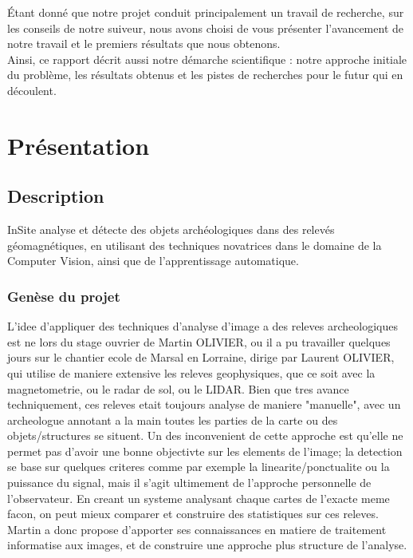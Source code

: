 \documentclass[a4paper, 12pt, titlepage, oneside, french]{article}
\begin{document}
	Étant donné que notre projet conduit principalement un travail de recherche, sur les conseils de notre suiveur, nous avons choisi de vous présenter l'avancement de notre travail et le premiers résultats que nous obtenons. \\
	Ainsi, ce rapport décrit aussi notre démarche scientifique : notre approche initiale du problème, les résultats obtenus et les pistes de recherches pour le futur qui en découlent.
	
	\newpage
\section{Présentation}
	\subsection{Description}%
		InSite analyse et détecte des objets archéologiques dans des relevés géomagnétiques, en utilisant des techniques novatrices dans le domaine de
		la Computer Vision, ainsi que de l'apprentissage automatique.

		\subsubsection{Genèse du projet}
		L'idee d'appliquer des techniques d'analyse d'image a des releves archeologiques est ne lors du stage ouvrier de Martin OLIVIER, ou il a pu travailler quelques jours sur le chantier ecole de Marsal en Lorraine, dirige par Laurent OLIVIER, qui utilise de maniere extensive les releves geophysiques, que ce soit avec la magnetometrie, ou le radar de sol, ou le LIDAR. Bien que tres avance techniquement, ces releves etait toujours analyse de maniere "manuelle", avec un archeologue annotant a la main toutes les parties de la carte ou des objets/structures se situent. Un des inconvenient de cette approche est qu'elle ne permet pas d'avoir une bonne objectivte sur les elements de l'image; la detection se base sur quelques criteres comme par exemple la linearite/ponctualite ou la puissance du signal, mais il s'agit ultimement de l'approche personnelle de l'observateur. En creant un systeme analysant chaque cartes de l'exacte meme facon, on peut mieux comparer et construire des statistiques sur ces releves. Martin a donc propose d'apporter ses connaissances en matiere de traitement informatise aux images, et de construire une approche plus structure de l'analyse.
\end{document}
